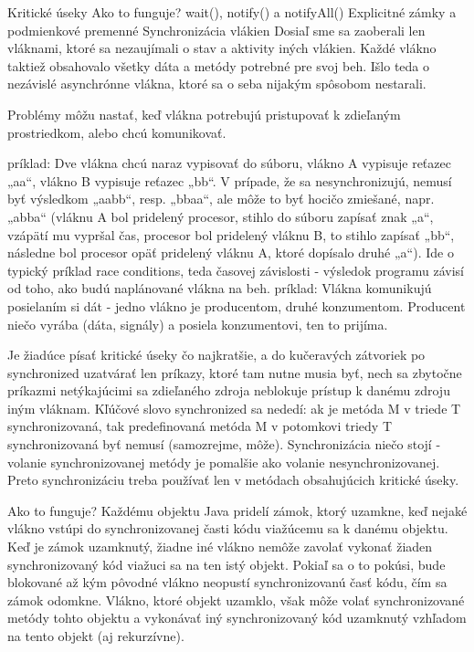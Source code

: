 Kritické úseky
Ako to funguje?
wait(), notify() a notifyAll()
Explicitné zámky a podmienkové premenné
Synchronizácia vlákien
Dosiaľ sme sa zaoberali len vláknami, ktoré sa nezaujímali o stav a aktivity iných vlákien. Každé vlákno taktiež obsahovalo všetky dáta a metódy potrebné pre svoj beh. Išlo teda o nezávislé asynchrónne vlákna, ktoré sa o seba nijakým spôsobom nestarali.

Problémy môžu nastať, keď vlákna potrebujú pristupovať k zdieľaným prostriedkom, alebo chcú komunikovať.

príklad: Dve vlákna chcú naraz vypisovať do súboru, vlákno A vypisuje reťazec „aa“, vlákno B vypisuje reťazec „bb“. V prípade, že sa nesynchronizujú, nemusí byť výsledkom „aabb“, resp. „bbaa“, ale môže to byť hocičo zmiešané, napr. „abba“ (vláknu A bol pridelený procesor, stihlo do súboru zapísať znak „a“, vzápätí mu vypršal čas, procesor bol pridelený vláknu B, to stihlo zapísať „bb“, následne bol procesor opäť pridelený vláknu A, ktoré dopísalo druhé „a“). Ide o typický príklad race conditions, teda časovej závislosti - výsledok programu závisí od toho, ako budú naplánované vlákna na beh.
príklad: Vlákna komunikujú posielaním si dát - jedno vlákno je producentom, druhé konzumentom. Producent niečo vyrába (dáta, signály) a posiela konzumentovi, ten to prijíma.

	Je žiadúce písať kritické úseky čo najkratšie, a do kučeravých zátvoriek po synchronized uzatvárať len príkazy, ktoré tam nutne musia byť, nech sa zbytočne príkazmi netýkajúcimi sa zdieľaného zdroja neblokuje prístup k danému zdroju iným vláknam. Kľúčové slovo synchronized sa nededí: ak je metóda M v triede T synchronizovaná, tak predefinovaná metóda M v potomkovi triedy T synchronizovaná byť nemusí (samozrejme, môže). Synchronizácia niečo stojí - volanie synchronizovanej metódy je pomalšie ako volanie nesynchronizovanej. Preto synchronizáciu treba používať len v metódach obsahujúcich kritické úseky.

Ako to funguje?
Každému objektu Java pridelí zámok, ktorý uzamkne, keď nejaké vlákno vstúpi do synchronizovanej časti kódu viažúcemu sa k danému objektu. Keď je zámok uzamknutý, žiadne iné vlákno nemôže zavolať vykonať žiaden synchronizovaný kód viažuci sa na ten istý objekt. Pokiaľ sa o to pokúsi, bude blokované až kým pôvodné vlákno neopustí synchronizovanú časť kódu, čím sa zámok odomkne. Vlákno, ktoré objekt uzamklo, však môže volať synchronizované metódy tohto objektu a vykonávať iný synchronizovaný kód uzamknutý vzhľadom na tento objekt (aj rekurzívne).

